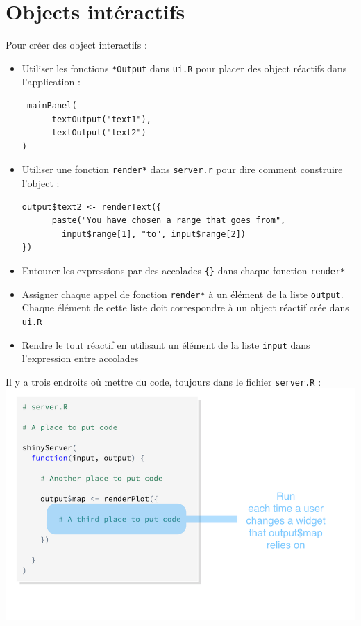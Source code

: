 \documentclass{article}
\begin{document}
\section{Objects intéractifs} 
Pour créer des object interactifs :\\
\begin{itemize}
\item Utiliser les fonctions \verb!*Output! dans \verb!ui.R! pour placer des object réactifs dans l'application :
\begin{verbatim}
 mainPanel(
      textOutput("text1"),
      textOutput("text2")
)
\end{verbatim}
\item Utiliser une fonction \verb!render*! dans \verb!server.r! pour dire comment construire l'object :
\begin{verbatim}
output$text2 <- renderText({ 
      paste("You have chosen a range that goes from",
        input$range[1], "to", input$range[2])
})
\end{verbatim}
\item Entourer les expressions par des accolades \verb!{}! dans chaque fonction \verb!render*! 
\item Assigner chaque appel de fonction \verb!render*! à un élément de la liste \verb!output!. Chaque élément de cette liste doit correspondre à un object réactif crée dans \verb!ui.R!
\item Rendre le tout réactif en utilisant un élément de la liste \verb!input! dans l'expression entre accolades 
\end{itemize}

Il y a trois endroits où mettre du code, toujours dans le fichier \verb!server.R! :
\includegraphics[scale=0.4]{place-of-code}
\end{document}
